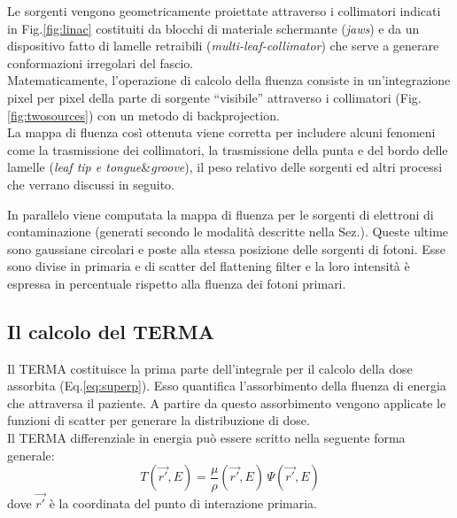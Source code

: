 {Le sorgenti vengono geometricamente proiettate attraverso i collimatori indicati in Fig.\ref{fig:linac} costituiti da blocchi di materiale schermante (\textit{jaws}) e da un dispositivo fatto di lamelle retraibili (\textit{multi-leaf-collimator}) che serve a generare conformazioni irregolari del fascio.\\
Matematicamente, l'operazione di calcolo della fluenza consiste in un'integrazione pixel per pixel della parte di sorgente \textquotedblleft visibile\textquotedblright{} attraverso i collimatori (Fig.\ref{fig:twosources}) con un metodo di backprojection.\\
La mappa di fluenza così ottenuta viene corretta per includere alcuni fenomeni come la trasmissione dei collimatori, la trasmissione della punta e del bordo delle lamelle (\textit{leaf tip e tongue}\&\textit{groove}), il peso relativo delle sorgenti ed altri processi che verrano discussi in seguito.

In parallelo viene computata la mappa di fluenza per le sorgenti di elettroni di contaminazione (generati secondo le modalità descritte nella Sez.\label{sec:intro}). Queste ultime sono gaussiane circolari e poste alla stessa posizione delle sorgenti di fotoni. Esse sono divise in primaria e di scatter del flattening filter e la loro intensità è espressa in percentuale rispetto alla fluenza dei fotoni primari.

\subsection{Il calcolo del TERMA}
Il TERMA costituisce la prima parte dell'integrale per il calcolo della dose assorbita (Eq.\ref{eq:superp}). Esso quantifica l'assorbimento della fluenza di energia che attraversa il paziente. A partire da questo assorbimento vengono applicate le funzioni di scatter per generare la distribuzione di dose.\\
Il TERMA differenziale in energia può essere scritto nella seguente forma generale:
\begin{equation}
\label{eq:termaE}
T(\vec{r'},E) = \frac{\mu}{\rho}(\vec{r'},E)\,\Psi(\vec{r'},E)
\end{equation}
dove $\vec{r'}$ è la coordinata del punto di interazione primaria.

}
